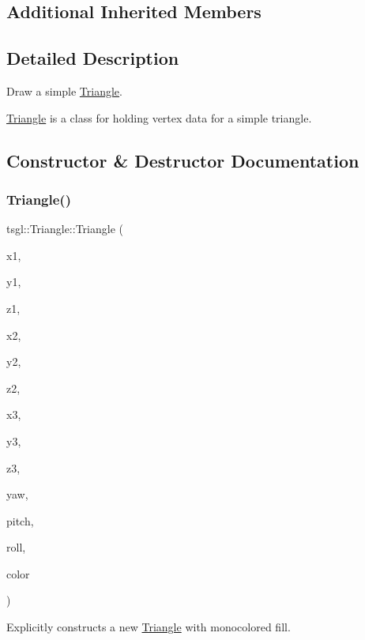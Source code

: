 \subsection*{Additional Inherited Members}


\subsection{Detailed Description}
Draw a simple \hyperlink{classtsgl_1_1_triangle}{Triangle}. 

\hyperlink{classtsgl_1_1_triangle}{Triangle} is a class for holding vertex data for a simple triangle. 

\subsection{Constructor \& Destructor Documentation}
\mbox{\label{classtsgl_1_1_triangle_a810340db0727581a93729cc889ba5c29}} 
\subsubsection{\texorpdfstring{Triangle()}{Triangle()}\hspace{0.1cm}{\footnotesize\ttfamily [1/2]}}
{\footnotesize\ttfamily tsgl\+::\+Triangle\+::\+Triangle (\begin{DoxyParamCaption}\item[{float}]{x1,  }\item[{float}]{y1,  }\item[{float}]{z1,  }\item[{float}]{x2,  }\item[{float}]{y2,  }\item[{float}]{z2,  }\item[{float}]{x3,  }\item[{float}]{y3,  }\item[{float}]{z3,  }\item[{float}]{yaw,  }\item[{float}]{pitch,  }\item[{float}]{roll,  }\item[{\hyperlink{structtsgl_1_1_color_float}{Color\+Float}}]{color }\end{DoxyParamCaption})}



Explicitly constructs a new \hyperlink{classtsgl_1_1_triangle}{Triangle} with monocolored fill. 

